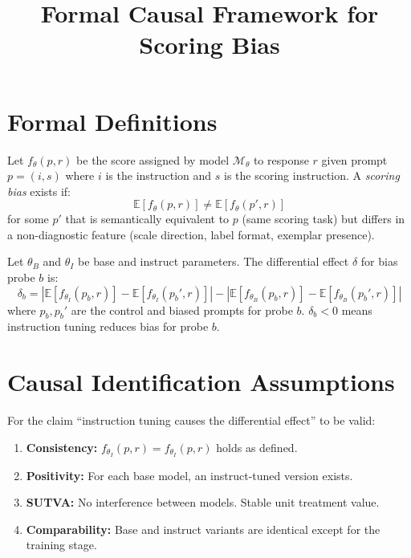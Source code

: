 \documentclass[11pt]{article}
\title{Formal Causal Framework for Scoring Bias}
\author{}
\begin{document}
\maketitle

\section{Formal Definitions}

\begin{definition}
Let $f_\theta(p, r)$ be the score assigned by model $\mathcal{M}_\theta$ to response $r$ given prompt $p = (i, s)$ where $i$ is the instruction and $s$ is the scoring instruction. A \emph{scoring bias} exists if:
\[
\mathbb{E}[f_\theta(p, r)] \neq \mathbb{E}[f_\theta(p', r)]
\]
for some $p'$ that is semantically equivalent to $p$ (same scoring task) but differs in a non-diagnostic feature (scale direction, label format, exemplar presence).
\end{definition}

\begin{definition}
Let $\theta_B$ and $\theta_I$ be base and instruct parameters. The differential effect $\delta$ for bias probe $b$ is:
\[
\delta_b = |\mathbb{E}[f_{\theta_I}(p_b, r)] - \mathbb{E}[f_{\theta_I}(p_b', r)]| - |\mathbb{E}[f_{\theta_B}(p_b, r)] - \mathbb{E}[f_{\theta_B}(p_b', r)]|
\]
where $p_b, p_b'$ are the control and biased prompts for probe $b$.
$\delta_b < 0$ means instruction tuning reduces bias for probe $b$.
\end{definition}

\section{Causal Identification Assumptions}

For the claim ``instruction tuning causes the differential effect'' to be valid:

\begin{enumerate}
    \item \textbf{Consistency:} $f_{\theta_I}(p, r) = f_{\theta_I}(p, r)$ holds as defined.
    \item \textbf{Positivity:} For each base model, an instruct-tuned version exists.
    \item \textbf{SUTVA:} No interference between models. Stable unit treatment value.
    \item \textbf{Comparability:} Base and instruct variants are identical except for the training stage.
\end{enumerate}
\end{document}

